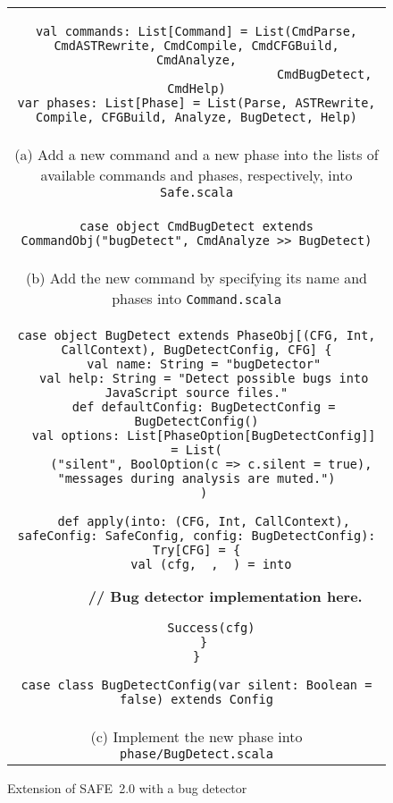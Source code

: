 \documentclass[10pt, conference]{IEEEtran}
\newcommand{\mtt}[1]{\texttt{\small #1}}
\newcommand{\safe}{{SAFE~2.0}\xspace}
\begin{document}
\setcounter{figure}{1}
\begin{figure*}[t]
\centering
\begin{tabular}{c}
\begin{minipage}{.95\textwidth}
\footnotesize
\begin{verbatim}
val commands: List[Command] = List(CmdParse, CmdASTRewrite, CmdCompile, CmdCFGBuild, CmdAnalyze,
                                   CmdBugDetect, CmdHelp)
var phases: List[Phase] = List(Parse, ASTRewrite, Compile, CFGBuild, Analyze, BugDetect, Help)
\end{verbatim}
\end{minipage}
\\[1.5em]
{\small (a) Add a new command and a new phase into the lists of available
commands and phases, respectively, into \mtt{Safe.scala}}
\\[1em]
\begin{minipage}{.95\textwidth}
\footnotesize
\begin{verbatim}
case object CmdBugDetect extends CommandObj("bugDetect", CmdAnalyze >> BugDetect)
\end{verbatim}
\end{minipage}
\\[1em]
{\small (b) Add the new command by specifying its name and phases into \mtt{Command.scala}}
\\[1em]
\begin{minipage}{.95\textwidth}
\footnotesize
\begin{verbatim}
case object BugDetect extends PhaseObj[(CFG, Int, CallContext), BugDetectConfig, CFG] {
  val name: String = "bugDetector"
  val help: String = "Detect possible bugs into JavaScript source files."
  def defaultConfig: BugDetectConfig = BugDetectConfig()
  val options: List[PhaseOption[BugDetectConfig]] = List(
    ("silent", BoolOption(c => c.silent = true), "messages during analysis are muted.")
  )

  def apply(into: (CFG, Int, CallContext), safeConfig: SafeConfig, config: BugDetectConfig): Try[CFG] = {
    val (cfg, _, _) = into
\end{verbatim}
\vspace*{-.6em}
\textbf{~~~~~~~// Bug detector implementation here.}
\vspace*{-.8em}
\begin{verbatim}
    Success(cfg)
  }
}

case class BugDetectConfig(var silent: Boolean = false) extends Config
\end{verbatim}
\end{minipage}
\\
{\small (c) Implement the new phase into \mtt{phase/BugDetect.scala}}
\end{tabular}
\caption{\small Extension of \safe with a bug detector~\cite{jswapp}}
\label{fig:extensibility}
\end{figure*}
\end{document}
